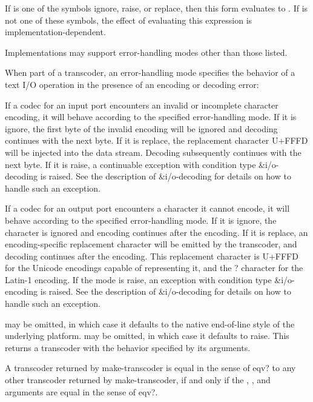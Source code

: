 \begin{entry}{%
}

If  is one of the symbols {\cf ignore}, {\cf raise}, or {\cf
  replace}, then this form evaluates to .  If  is
not one of these symbols, the effect of evaluating this expression is
implementation-dependent.

\begin{rationale}
  Implementations may support error-handling modes other than those
  listed.
\end{rationale}

When part of a transcoder, an error-handling mode specifies the behavior
of a text I/O operation in the presence of an encoding or decoding
error:

If a codec for an input port encounters an invalid or incomplete
character encoding, it will behave according to the specified
error-handling mode. If it is {\cf ignore}, the first byte of the
invalid encoding will be ignored and decoding continues with the next
byte.  If it is {\cf replace}, the replacement character U+FFFD will
be injected into the data stream.  Decoding subsequently continues
with the next byte. If it is {\cf raise}, a continuable exception with
condition type {\cf\&i/o-decoding} is raised.  See the description of
{\cf\&i/o-decoding} for details
on how to handle such an exception.

If a codec for an output port encounters a character it cannot encode,
it will behave according to the specified error-handling mode. If it
is {\cf ignore}, the character is ignored and encoding continues after
the encoding. If it is {\cf replace}, an encoding-specific replacement
character will be emitted by the transcoder, and decoding continues
after the encoding. This replacement character is U+FFFD for the
Unicode encodings capable of representing it, and the {\cf ?}
character for the Latin-1 encoding. If the mode is {\cf raise}, an
exception with condition type {\cf\&i/o-encoding} is raised.
See the description of
{\cf\&i/o-decoding} for details
on how to handle such an exception.
\end{entry}

\begin{entry}{%
}

   may be omitted, in
which case it defaults to the native end-of-line style of the
underlying platform.   may be omitted, in which
case it defaults to {\cf raise}.  This returns a transcoder with the
behavior specified by its arguments.

A transcoder returned by {\cf make-transcoder} is equal in the sense
of {\cf eqv?} to any other transcoder returned by {\cf
  make-transcoder}, if and only if the , ,
and  arguments are equal in the sense of {\cf
  eqv?}.
\end{entry}

